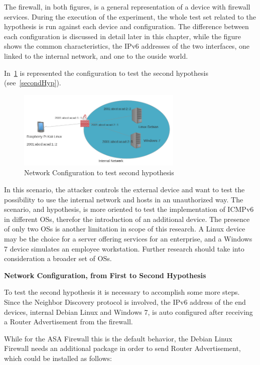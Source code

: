 \documentclass[12pt]{article}
\begin{document}
The firewall, in both figures, is a general representation of a device with firewall services. During the execution of the experiment, the whole test set related to the hypothesis is run against each device and configuration. The difference between each configuration is discussed in detail later in this chapter, while the figure shows the common characteristics, the IPv6 addresses of the two interfaces, one linked to the internal network, and one to the ouside world.

In~\ref{fig:netConfiguration2} is represented the configuration to test the second hypothesis (see~\ref{secondHyp}).

\begin{figure}[ht] 
\begin{center}
\includegraphics[width=0.7\textwidth]{networkTopology2}
\caption{Network Configuration to test second hypothesis}
\label{fig:netConfiguration2}
\end{center}
\end{figure}

In this scenario, the attacker controls the external device and want to test the possibility to use the internal network and hosts in an unauthorized way. The scenario, and hypothesis, is more oriented to test the implementation of ICMPv6 in different OSs, therefor the introduction of an additional device. The presence of only two OSs is another limitation in scope of this research. A Linux device may be the choice for a server offering services for an enterprise, and a Windows 7 device simulates an employee workstation. Further research should take into consideration a broader set of OSs.

\textbf{Network Configuration, from First to Second Hypothesis}

To test the second hypothesis it is necessary to accomplish some more steps. Since the Neighbor Discovery protocol is involved, the IPv6 address of the end devices, internal Debian Linux and Windows 7, is auto configured after receiving a Router Advertisement from the firewall.

While for the ASA Firewall this is the default behavior, the Debian Linux Firewall needs an additional package in order to send Router Advertisement, which could be installed as follows:
\end{document}
